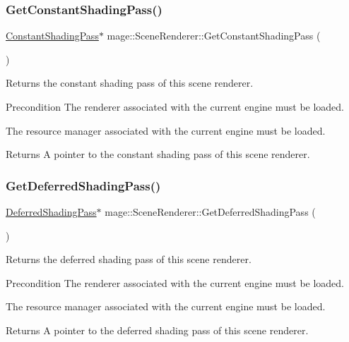 \subsubsection{\texorpdfstring{Get\+Constant\+Shading\+Pass()}{GetConstantShadingPass()}}
{\footnotesize\ttfamily \hyperlink{classmage_1_1_constant_shading_pass}{Constant\+Shading\+Pass}$\ast$ mage\+::\+Scene\+Renderer\+::\+Get\+Constant\+Shading\+Pass (\begin{DoxyParamCaption}{ }\end{DoxyParamCaption})}

Returns the constant shading pass of this scene renderer.

\begin{DoxyPrecond}{Precondition}
The renderer associated with the current engine must be loaded. 

The resource manager associated with the current engine must be loaded. 
\end{DoxyPrecond}
\begin{DoxyReturn}{Returns}
A pointer to the constant shading pass of this scene renderer. 
\end{DoxyReturn}
\hypertarget{classmage_1_1_scene_renderer_aa0a9b451bdb7b96672bece024f733178}{}\label{classmage_1_1_scene_renderer_aa0a9b451bdb7b96672bece024f733178} 
\subsubsection{\texorpdfstring{Get\+Deferred\+Shading\+Pass()}{GetDeferredShadingPass()}}
{\footnotesize\ttfamily \hyperlink{classmage_1_1_deferred_shading_pass}{Deferred\+Shading\+Pass}$\ast$ mage\+::\+Scene\+Renderer\+::\+Get\+Deferred\+Shading\+Pass (\begin{DoxyParamCaption}{ }\end{DoxyParamCaption})}

Returns the deferred shading pass of this scene renderer.

\begin{DoxyPrecond}{Precondition}
The renderer associated with the current engine must be loaded. 

The resource manager associated with the current engine must be loaded. 
\end{DoxyPrecond}
\begin{DoxyReturn}{Returns}
A pointer to the deferred shading pass of this scene renderer. 
\end{DoxyReturn}
\hypertarget{classmage_1_1_scene_renderer_ab244160e40057cfbd5a05234621466bd}{}\label{classmage_1_1_scene_renderer_ab244160e40057cfbd5a05234621466bd} 
